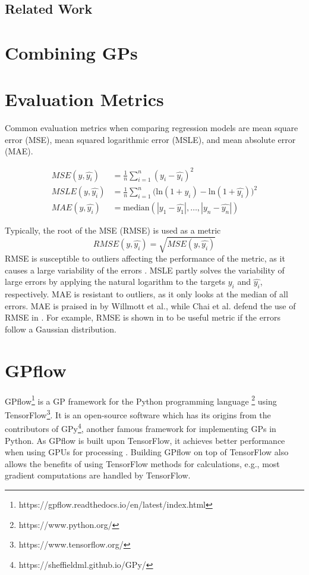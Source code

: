 \subsection{Related Work}
\section{Combining GPs}

\section{Evaluation Metrics}
Common evaluation metrics when comparing regression models are mean square error (MSE), mean squared logarithmic error (MSLE), and mean absolute error (MAE).

\begin{align}
    MSE(y, \hat{y_i}) &= \frac{1}{n} \sum_{i=1}^{n} (y_i - \hat{y_i})^2 \label{eq:rmse} \\
    MSLE(y, \hat{y_i}) &= \frac{1}{n} \sum_{i=1}^{n} \big( \textrm{ln}(1+y_i) - \textrm{ln}(1+\hat{y_i}) \big)^2 \label{eq:msle} \\
    MAE(y, \hat{y_i}) &= \textrm{median}(|y_1-\hat{y_1}|, \ldots, |y_n-\hat{y_n}|)\label{eq:mae}
\end{align}

Typically, the root of the MSE (RMSE) is used as a metric
\begin{equation}
    RMSE(y, \hat{y_i}) = \sqrt{MSE(y, \hat{y_i})}
\end{equation}
RMSE is susceptible to outliers affecting the performance of the metric, as it causes a large variability of the errors \cite{Willmott2005}.
MSLE partly solves the variability of large errors by applying the natural logarithm to the targets $y_i$ and $\hat{y_i}$, respectively.
MAE is resistant to outliers, as it only looks at the median of all errors.
MAE is praised in \cite{Willmott2005} by Willmott et al., while Chai et al. defend the use of RMSE in \cite{Chai2014}.
For example, RMSE is shown in \cite{Chai2014} to be useful metric if the errors follow a Gaussian distribution.

\section{GPflow}
GPflow\footnote{https://gpflow.readthedocs.io/en/latest/index.html} \cite{GPflow2017} is a GP framework for the Python programming language \footnote{https://www.python.org/} using TensorFlow\footnote{https://www.tensorflow.org/}.
It is an open-source software which has its origins from the contributors of GPy\footnote{https://sheffieldml.github.io/GPy/}, another famous framework for implementing GPs in Python.
As GPflow is built upon TensorFlow, it achieves better performance when using GPUs for processing \cite{GPflow2017}.
Building GPflow on top of TensorFlow also allows the benefits of using TensorFlow methods for calculations, e.g., most gradient computations are handled by TensorFlow.

